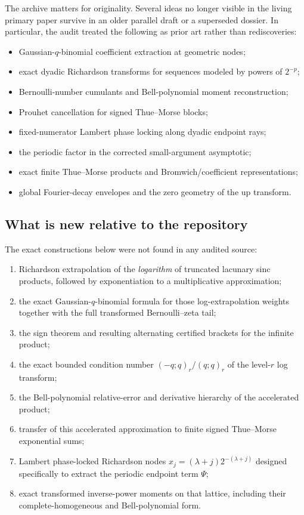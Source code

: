 \documentclass[11pt]{article}
\theoremstyle{definition}
\theoremstyle{remark}
\begin{document}
The archive matters for originality. Several ideas no longer visible in the living primary paper survive in an older parallel draft or a superseded dossier. In particular, the audit treated the following as prior art rather than rediscoveries:
\begin{itemize}
\item Gaussian-$q$-binomial coefficient extraction at geometric nodes;
\item exact dyadic Richardson transforms for sequences modeled by powers of $2^{-p}$;
\item Bernoulli-number cumulants and Bell-polynomial moment reconstruction;
\item Prouhet cancellation for signed Thue--Morse blocks;
\item fixed-numerator Lambert phase locking along dyadic endpoint rays;
\item the periodic factor in the corrected small-argument asymptotic;
\item exact finite Thue--Morse products and Bromwich/coefficient representations;
\item global Fourier-decay envelopes and the zero geometry of the up transform.
\end{itemize}

\subsection{What is new relative to the repository}

The exact constructions below were not found in any audited source:
\begin{enumerate}
\item Richardson extrapolation of the \emph{logarithm} of truncated lacunary sinc products, followed by exponentiation to a multiplicative approximation;
\item the exact Gaussian-$q$-binomial formula for those log-extrapolation weights together with the full transformed Bernoulli--zeta tail;
\item the sign theorem and resulting alternating certified brackets for the infinite product;
\item the exact bounded condition number $(-q;q)_r/(q;q)_r$ of the level-$r$ log transform;
\item the Bell-polynomial relative-error and derivative hierarchy of the accelerated product;
\item transfer of this accelerated approximation to finite signed Thue--Morse exponential sums;
\item Lambert phase-locked Richardson nodes $x_j=(\lambda+j)2^{-(\lambda+j)}$ designed specifically to extract the periodic endpoint term $\Psi$;
\item exact transformed inverse-power moments on that lattice, including their complete-homogeneous and Bell-polynomial form.
\end{enumerate}
\end{document}
